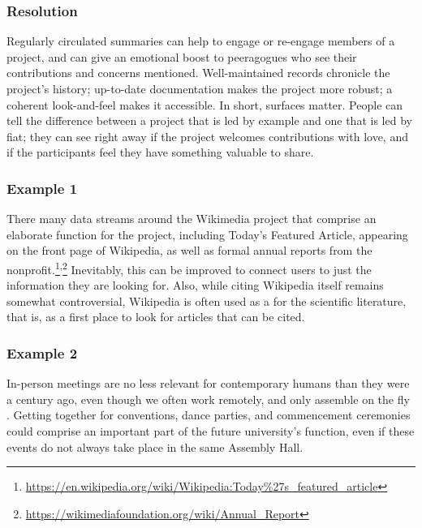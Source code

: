 \subsubsection*{Resolution} 
Regularly circulated summaries can help to engage or re-engage members of a project, and can give an emotional boost to peeragogues who see their contributions and concerns mentioned.  Well-maintained records chronicle the project's history; up-to-date documentation makes the project more robust; a coherent look-and-feel makes it accessible.
%
In short, surfaces matter.  People can tell the difference between a project that is led by example and one that is led by fiat;
they can see right away if the project welcomes contributions with love, and if the participants feel they have something valuable to share.

\subsubsection*{Example 1} 
There many data streams around the Wikimedia project that comprise
an elaborate  function for the project, including
Today's Featured Article, appearing on the front page of
Wikipedia, as well as formal annual reports from the nonprofit.\footnote{\url{https://en.wikipedia.org/wiki/Wikipedia:Today\%27s_featured_article}}\textsuperscript{,}\footnote{\url{https://wikimediafoundation.org/wiki/Annual_Report}}
Inevitably, this can be improved to connect users to just the
information they are looking for.  Also, while citing Wikipedia itself
remains somewhat controversial, Wikipedia is often used as a
 for the scientific literature, that is, as a
first place to look for articles that can be cited.

\subsubsection*{Example 2} In-person meetings are no less relevant
for contemporary humans than they were a century ago, even though we
often work remotely, and only assemble on the fly
\cite{rheingold2007smart}.  Getting together for conventions, dance
parties, and commencement ceremonies could comprise an important part
of the future university's  function, even if
these events do not always take place in the same Assembly Hall.



